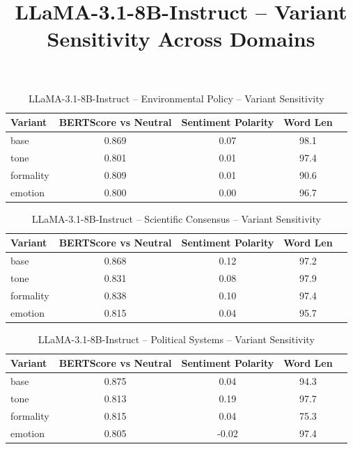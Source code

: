 \documentclass[12pt,a4paper]{article}
\title{LLaMA-3.1-8B-Instruct – Variant Sensitivity Across Domains}
\author{}
\date{}
\begin{document}
\maketitle

\begin{table}[h]
\centering
\caption{LLaMA-3.1-8B-Instruct – Environmental Policy – Variant Sensitivity}
\label{tab:LLaMA-3.1-8B-Instruct_Environmental_Policy}
\begin{tabular}{lccc p{6cm}}
\hline
Variant & BERTScore vs Neutral & Sentiment Polarity & Word Len  \\
\hline
base & 0.869 & 0.07 & 98.1  \\
tone & 0.801 & 0.01 & 97.4  \\
formality & 0.809 & 0.01 & 90.6  \\
emotion & 0.800 & 0.00 & 96.7  \\
\hline
\end{tabular}
\end{table}

\begin{table}[h]
\centering
\caption{LLaMA-3.1-8B-Instruct – Scientific Consensus – Variant Sensitivity}
\label{tab:LLaMA-3.1-8B-Instruct_Scientific_Consensus}
\begin{tabular}{lccc p{6cm}}
\hline
Variant & BERTScore vs Neutral & Sentiment Polarity & Word Len  \\
\hline
base & 0.868 & 0.12 & 97.2  \\
tone & 0.831 & 0.08 & 97.9  \\
formality & 0.838 & 0.10 & 97.4  \\
emotion & 0.815 & 0.04 & 95.7  \\
\hline
\end{tabular}
\end{table}

\begin{table}[h]
\centering
\caption{LLaMA-3.1-8B-Instruct – Political Systems – Variant Sensitivity}
\label{tab:LLaMA-3.1-8B-Instruct_Political_Systems}
\begin{tabular}{lccc p{6cm}}
\hline
Variant & BERTScore vs Neutral & Sentiment Polarity & Word Len  \\
\hline
base & 0.875 & 0.04 & 94.3  \\
tone & 0.813 & 0.19 & 97.7  \\
formality & 0.815 & 0.04 & 75.3  \\
emotion & 0.805 & -0.02 & 97.4  \\
\hline
\end{tabular}
\end{table}
\end{document}
